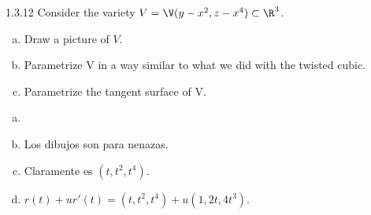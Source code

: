 \documentclass[twoside]{article}
\begin{document}
\begin{ejercicio}{1.3.12}
Consider the variety $V=\V(y-x^2,z-x^4) \subset \R^3$.
\begin{enumerate}[a.]
\item Draw a picture of $V$.
\item Parametrize V in a way similar to what we did with the twisted cubic.
\item Parametrize the tangent surface of V.
\end{enumerate}
\begin{solucion}
\begin{enumerate}[a.]
\item[]
\item Los dibujos son para nenazas.
\item Claramente es $(t,t^2,t^4)$. 
\item $r(t)+ur'(t) = (t,t^2,t^4)+u(1,2t,4t^3)$.
\end{enumerate}
\end{solucion}

\end{ejercicio}
\end{document}
